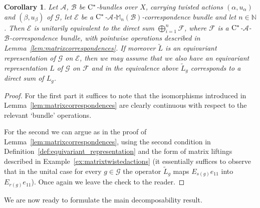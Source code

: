 \documentclass[11 pt, leqno]{amsart}
\numberwithin{equation}{section}
\theoremstyle{plain}
\newtheorem{cor}[thm]{Corollary}
\theoremstyle{definition}
\newcommand{\Mat}{\mathbb M} %
\newcommand{\B}{\mathcal B}
\newcommand{\G}{\mathcal G} %
\newcommand{\EE}{\mathcal E}
\newcommand{\FF}{\mathcal F}
\newcommand{\A}{\mathcal A}
\newcommand{\N}{\mathbb N}
\newcommand{\cst}{\ifmmode\mathrm{C}^*\else{$\mathrm{C}^*$}\fi}
\begin{document}
\begin{cor}\label{cor:matrixcorrespondencebundles}
Let $\A$, $\B$ be $\cst$-bundles over $X$, carrying twisted actions $(\alpha,u_\alpha)$ and $(\beta,u_\beta)$ of $\G$, let $\EE$ be a $\cst$-$\A$-$\Mat_n(\B)$-correspondence bundle and let $n \in \N$. 
Then $\EE$ is unitarily equivalent to the direct sum $\bigoplus_{i=1}^n \FF$, where $\FF$ is a $\cst$-$\A$-$\B$-correspondence bundle, with pointwise operations described in Lemma~\ref{lem:matrixcorrespondences}. 
If moreover $\tilde{L}$ is an equivariant representation of $\G$ on $\EE$, then we may assume that we also have an equivariant representation $L$ of $\G$ on $\FF$ and in the equivalence above $\tilde{L}_g$ corresponds to a direct sum of $L_g$. 
\end{cor}
\begin{proof}
For the first part it suffices to note that the isomorphisms introduced in Lemma~\ref{lem:matrixcorrespondences} are clearly continuous with respect to the relevant `bundle' operations.

For the second we can argue as in the proof of Lemma~\ref{lem:matrixcorrespondences}, using the second condition in Definition~\ref{def:equivariant_representation} and the form of matrix liftings described in Example~\ref{ex:matrixtwistedactions} (it essentially suffices to observe that in the unital case for every $g \in \G$ the operator $\tilde{L}_g$ maps $E_{s(g)} e_{11}$ into $E_{r(g)} e_{11}$). 
Once again we leave the check to the reader. 
\end{proof}

We are now ready to formulate the main decomposability result.
\end{document}
